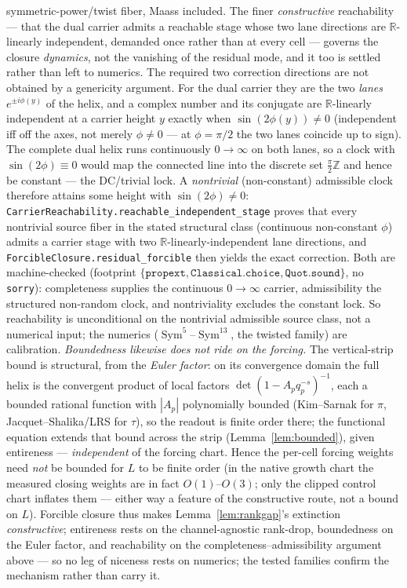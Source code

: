 \documentclass[11pt]{article}
\theoremstyle{definition}
\newcommand{\Sym}{\operatorname{Sym}}
\begin{document}
symmetric-power/twist fiber, Maass included. The finer \emph{constructive} reachability --- that the dual carrier admits a reachable stage whose two lane directions are $\mathbb R$-linearly independent, demanded once rather than at every cell --- governs the closure \emph{dynamics}, not the vanishing of the residual mode, and it too is settled rather than left to numerics. The required two correction directions are not obtained by a genericity argument. For the dual carrier they are the two \emph{lanes} $e^{\pm i\phi(y)}$ of the helix, and a complex number and its conjugate are $\mathbb R$-linearly independent at a carrier height $y$ exactly when $\sin(2\phi(y))\neq0$ (independent iff off the axes, not merely $\phi\neq0$ --- at $\phi=\pi/2$ the two lanes coincide up to sign). The complete dual helix runs continuously $0\to\infty$ on both lanes, so a clock with $\sin(2\phi)\equiv0$ would map the connected line into the discrete set $\tfrac{\pi}{2}\mathbb Z$ and hence be constant --- the DC/trivial lock. A \emph{nontrivial} (non-constant) admissible clock therefore attains some height with $\sin(2\phi)\neq0$: \texttt{CarrierReachability.reachable\_independent\_stage} proves that every nontrivial source fiber in the stated structural class (continuous non-constant $\phi$) admits a carrier stage with two $\mathbb R$-linearly-independent lane directions, and \texttt{ForcibleClosure.residual\_forcible} then yields the exact correction. Both are machine-checked (footprint $\{\texttt{propext},\texttt{Classical.choice},\texttt{Quot.sound}\}$, no \texttt{sorry}): completeness supplies the continuous $0\to\infty$ carrier, admissibility the structured non-random clock, and nontriviality excludes the constant lock. So reachability is unconditional on the nontrivial admissible source class, not a numerical input; the numerics ($\Sym^5$--$\Sym^{13}$, the twisted family) are calibration. \emph{Boundedness likewise does not ride on the forcing.} The vertical-strip bound is structural,
from the \emph{Euler factor}: on its convergence domain the full helix is the convergent product of local factors
$\det(1-A_{p}q_p^{-s})^{-1}$, each a bounded rational function with $|A_p|$ polynomially bounded (Kim--Sarnak for $\pi$, Jacquet--Shalika/LRS for $\tau$),
so the readout is finite order there; the functional equation extends that bound across the strip
(Lemma~\ref{lem:bounded}), given entireness --- \emph{independent} of the forcing chart. Hence the per-cell
forcing weights need \emph{not} be bounded for $L$ to be finite order (in the native growth chart the measured
closing weights are in fact $O(1)$--$O(3)$; only the clipped control chart inflates them --- either way a
feature of the constructive route, not a bound on $L$). Forcible closure
thus makes Lemma~\ref{lem:rankgap}'s extinction \emph{constructive}; entireness rests on the channel-agnostic
rank-drop, boundedness on the Euler factor, and reachability on the completeness--admissibility argument above ---
so no leg of niceness rests on numerics; the tested families confirm the mechanism rather than carry it.
\end{document}
